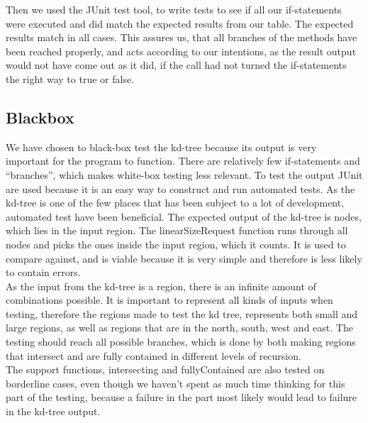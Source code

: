 \documentclass[a4paper,10pt,titlepage]{article}
\begin{document}
Then we used the JUnit test tool, to write tests to see if all our if-statements were executed and did match the expected results from our table. The expected results match in all cases. This assures us, that all branches of the methods have been reached properly, and acts according to our intentions, as the result output would not have come out as it did, if the call had not turned the if-statements the right way to true or false.


		\subsection{Blackbox}
		We have chosen to black-box test the kd-tree because its output is very important for the program to function. There are relatively few if-statements and “branches”, which makes white-box testing less relevant.
To test the output JUnit are used because it is an easy way to construct and run automated tests. As the kd-tree is one of the few places that has been subject to a lot of development, automated test have been beneficial. The expected output of the kd-tree is nodes, which lies in the input region. The linearSizeRequest function runs through all nodes and picks the ones inside the input region, which it counts. It is used to compare against, and is viable because it is very simple and therefore is less likely to contain errors.\\
As the input from the kd-tree is a region, there is an infinite amount of combinations possible. It is important to represent all kinds of inputs when testing, therefore the regions made to test the kd tree, represents both small and large regions, as well as regions that are in the north, south, west and east. The testing should reach all possible branches, which is done by both making regions that intersect and are fully contained in different levels of recursion.\\
The support functions, intersecting and fullyContained are also tested on borderline cases, even though we haven’t spent as much time thinking for this part of the testing, because a failure in the part most likely would lead to failure in the kd-tree output.\\

			
\end{document}
